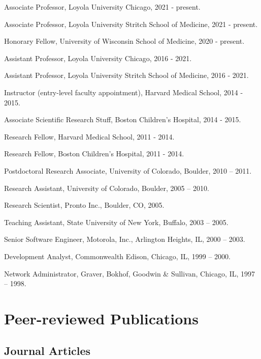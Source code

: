 \documentclass[letterpaper]{article}
\renewenvironment{itemize}{
  \begin{list}{}{
    \setlength{\leftmargin}{1.5em}
  }
}{
  \end{list}
}
\begin{document}
\begin{itemize}
\item Associate Professor, Loyola University Chicago, 2021 - present.
\item Associate Professor, Loyola University Stritch School of Medicine, 2021 - present.
\item Honorary Fellow, University of Wisconsin School of Medicine, 2020 - present.
\item Assistant Professor, Loyola University Chicago, 2016 - 2021.
\item Assistant Professor, Loyola University Stritch School of Medicine, 2016 - 2021.
\item Instructor (entry-level faculty appointment), Harvard Medical School, 2014 - 2015.
\item Associate Scientific Research Stuff, Boston Children's Hospital, 2014 - 2015.
\item Research Fellow, Harvard Medical School, 2011 - 2014.
\item Research Fellow, Boston Children's Hospital, 2011 - 2014.
\item Postdoctoral Research Associate, University of Colorado, Boulder, 2010 -- 2011.
\item Research Assistant, University of Colorado, Boulder, 2005 -- 2010.
\item Research Scientist, Pronto Inc., Boulder, CO, 2005.
\item Teaching Assistant, State University of New York, Buffalo, 2003 -- 2005.
\item Senior Software Engineer, Motorola, Inc., Arlington Heights, IL, 2000 -- 2003.
\item Development Analyst, Commonwealth Edison, Chicago, IL, 1999 -- 2000.
\item Network Administrator, Graver, Bokhof, Goodwin \& Sullivan, Chicago, IL, 1997 -- 1998.
\end{itemize}

\section*{Peer-reviewed Publications}

\subsection*{Journal Articles}
\end{document}
